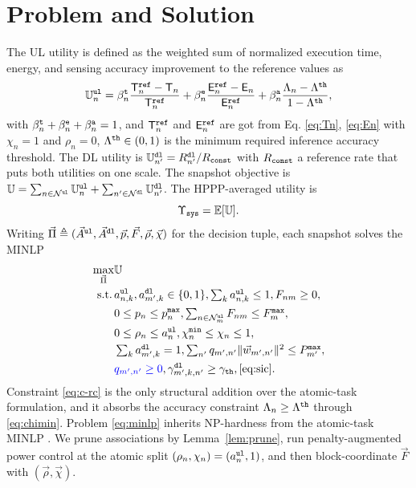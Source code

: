 \documentclass[journal]{IEEEtran}
\begin{document}
\section{Problem and Solution}
\label{sec:sol}
{\color{blue}The UL utility is defined as the weighted sum of normalized execution time, energy, and sensing accuracy improvement to the reference values as}
\begin{equation}
\mathbb{U}_n^{\tt ul}
=\beta_n^{\tt t}\frac{\mathsf{T}_n^{\tt ref}-\mathsf{T}_n}{\mathsf{T}_n^{\tt ref}}
+\beta_n^{\tt e}\frac{\mathsf{E}_n^{\tt ref}-\mathsf{E}_n}{\mathsf{E}_n^{\tt ref}}
+\beta_n^{\tt a}\frac{\Lambda_n-\Lambda^{\tt th}}{1-\Lambda^{\tt th}},
\label{eq:Uul}
\end{equation}
with $\beta_n^{\tt t}+\beta_n^{\tt e}+\beta_n^{\tt a}=1$, and {\color{blue}$\mathsf{T}_n^{\tt ref}$ and $\mathsf{E}_n^{\tt ref}$ are got from Eq. \eqref{eq:Tn}, \eqref{eq:En} with $\chi_n=1$ and $\rho_n=0$, $\Lambda^{\tt th} \in (0, 1)$ is the minimum required inference accuracy threshold.}
The DL utility is $\mathbb{U}_{n'}^{\tt dl}=R_{n'}^{\tt dl}/R_{\tt const}$ with $R_{\tt const}$ a reference rate that puts both utilities on one scale. The snapshot objective is $\mathbb{U}=\sum_{n\in\mathcal{N}^{\tt ul}}\mathbb{U}_n^{\tt ul}+\sum_{n'\in\mathcal{N}^{\tt dl}}\mathbb{U}_{n'}^{\tt dl}$. The HPPP-averaged utility is
\begin{equation}
\Upsilon_{\tt sys}
=\mathbb{E}[\mathbb{U}].
\label{eq:upsilon}
\end{equation}
Writing $\vec{\Pi}\triangleq(\vec{A}^{\tt ul},\vec{A}^{\tt dl},\vec{p},\vec{F},\vec{\rho},\vec{\chi})$ for the decision tuple, each snapshot solves the MINLP
\begin{subequations}\label{eq:minlp}
\begin{align}
\max_{\vec{\Pi}}&\mathbb{U}\\
\mathrm{s.t.}\,&a_{n,k}^{\tt ul},a_{m',k}^{\tt dl}\in\{0,1\},\textstyle\sum_k a_{n,k}^{\tt ul}\le1,F_{nm}\ge0,\label{eq:c-a}\\
&0\le p_n\le p_n^{\tt max},\textstyle\sum_{n\in\mathcal{N}_m^{\tt ul}}F_{nm}\le F_m^{\tt max},\label{eq:c-pf}\\
&0\le\rho_n\le a_n^{\tt ul},\chi_n^{\tt min}\le\chi_n\le1,\label{eq:c-rc}\\
&\textstyle\sum_k a_{m',k}^{\tt dl}=1,\textstyle\sum_{n'}q_{m',n'}\Vert\vec{w}_{m',n'}\Vert^2\le P_{m'}^{\tt max},\label{eq:c-dl}\\
&{\color{blue}q_{m',n'} \ge 0}, \gamma_{m',k,n'}^{\tt dl}\ge\gamma_{\tt th},\eqref{eq:sic}. \label{eq:c-sic}
\end{align}
\end{subequations}
Constraint \eqref{eq:c-rc} is the only structural addition over the atomic-task formulation, and it absorbs the accuracy constraint $\Lambda_n\ge\Lambda^{\tt th}$ through \eqref{eq:chimin}. Problem \eqref{eq:minlp} inherits NP-hardness from the atomic-task MINLP \cite{Hoang_TCOM_2024}. We prune associations by Lemma~\ref{lem:prune}, run penalty-augmented power control at the atomic split $(\rho_n,\chi_n)=(a_n^{\tt ul},1)$, and then block-coordinate $\vec{F}$ with $(\vec{\rho},\vec{\chi})$.
\end{document}

